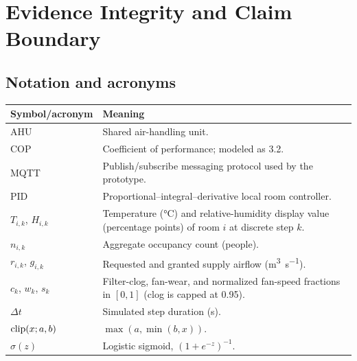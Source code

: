 \chapter*{Evidence Integrity and Claim Boundary}

\section*{Notation and acronyms}
\begin{longtable}{L{0.19\textwidth}L{0.72\textwidth}}
\toprule
Symbol/acronym & Meaning \\
\midrule
\endhead
AHU & Shared air-handling unit. \\
COP & Coefficient of performance; modeled as 3.2. \\
MQTT & Publish/subscribe messaging protocol used by the prototype. \\
PID & Proportional--integral--derivative local room controller. \\
$T_{i,k}$, $H_{i,k}$ & Temperature (\si{\celsius}) and relative-humidity display value (percentage points) of room $i$ at discrete step $k$. \\
$n_{i,k}$ & Aggregate occupancy count (people). \\
$r_{i,k}$, $g_{i,k}$ & Requested and granted supply airflow (\si{\meter\cubed\per\second}). \\
$c_k$, $w_k$, $s_k$ & Filter-clog, fan-wear, and normalized fan-speed fractions in $[0,1]$ (clog is capped at 0.95). \\
$\Delta t$ & Simulated step duration (\si{\second}). \\
$\operatorname{clip}(x;a,b)$ & $\max(a,\min(b,x))$. \\
$\sigma(z)$ & Logistic sigmoid, $(1+e^{-z})^{-1}$. \\
\bottomrule
\end{longtable}
